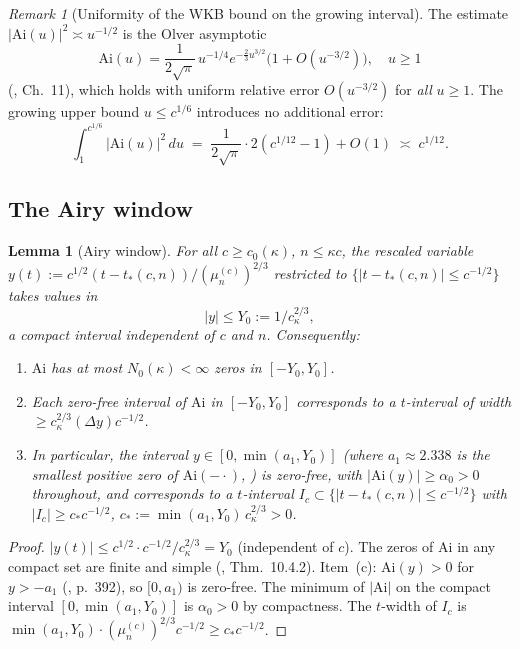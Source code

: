 \documentclass[12pt,a4paper]{amsart}
\newtheorem{lemma}[theorem]{Lemma}
\theoremstyle{definition}
\theoremstyle{remark}
\newtheorem{remark}[theorem]{Remark}
\newcommand{\Ai}{\mathrm{Ai}}
\newcommand{\tstar}{t_*(c,n)}
\begin{document}
\begin{remark}[Uniformity of the WKB bound on the growing interval]
\label{rem:olver-uniform-kappa}
The estimate $|\Ai(u)|^2\asymp u^{-1/2}$ is the Olver asymptotic
\[
  \Ai(u) = \frac{1}{2\sqrt{\pi}}\,u^{-1/4}
  e^{-\frac{2}{3}u^{3/2}}\bigl(1 + O(u^{-3/2})\bigr),
  \quad u \ge 1
\]
(\cite{Olver1974}, Ch.~11), which holds with uniform
relative error $O(u^{-3/2})$ for \emph{all} $u\ge 1$.
The growing upper bound $u\le c^{1/6}$ introduces no
additional error:
\[
  \int_1^{c^{1/6}} |\Ai(u)|^2\,du
  \;=\; \frac{1}{2\sqrt{\pi}}\cdot 2(c^{1/12}-1) + O(1)
  \;\asymp\; c^{1/12}.
\]
\end{remark}

\subsection{The Airy window}

\begin{lemma}[Airy window]
\label{lem:airy-window}
For all $c\ge c_0(\kappa)$, $n\le\kappa c$,
the rescaled variable
$y(t):=c^{1/2}(t-\tstar)/(\mu_n^{(c)})^{2/3}$
restricted to $\{|t-\tstar|\le c^{-1/2}\}$
takes values in
\begin{equation}\label{eq:y-window}
  |y|\le Y_0:=1/c_\kappa^{2/3},
\end{equation}
a compact interval independent of $c$ and $n$.
Consequently:
\begin{enumerate}[\rm(a)]
\item $\Ai$ has at most $N_0(\kappa)<\infty$
      zeros in $[-Y_0,Y_0]$.
\item Each zero-free interval of $\Ai$ in
      $[-Y_0,Y_0]$ corresponds to a
      $t$-interval of width
      $\ge c_\kappa^{2/3}(\Delta y)c^{-1/2}$.
\item In particular, the interval
      $y\in[0,\min(a_1,Y_0)]$
      (where $a_1\approx 2.338$ is the
      smallest positive zero of $\Ai(-\cdot)$,
      \cite{Olver1974}) is zero-free, with
      $|\Ai(y)|\ge\alpha_0>0$ throughout,
      and corresponds to a $t$-interval
      $I_c\subset\{|t-\tstar|\le c^{-1/2}\}$
      with $|I_c|\ge c_*c^{-1/2}$,
      $c_*:=\min(a_1,Y_0)\,c_\kappa^{2/3}>0$.
\end{enumerate}
\end{lemma}

\begin{proof}
$|y(t)|\le c^{1/2}\cdot c^{-1/2}/c_\kappa^{2/3}=Y_0$
(independent of $c$).
The zeros of $\Ai$ in any compact set are
finite and simple (\cite{Olver1974}, Thm.~10.4.2).
Item~(c): $\Ai(y)>0$ for $y>-a_1$
(\cite{Olver1974}, p.~392),
so $[0,a_1)$ is zero-free.
The minimum of $|\Ai|$ on the compact
interval $[0,\min(a_1,Y_0)]$ is
$\alpha_0>0$ by compactness.
The $t$-width of $I_c$ is
$\min(a_1,Y_0)\cdot(\mu_n^{(c)})^{2/3}c^{-1/2}
\ge c_*c^{-1/2}$.
\end{proof}
\end{document}
